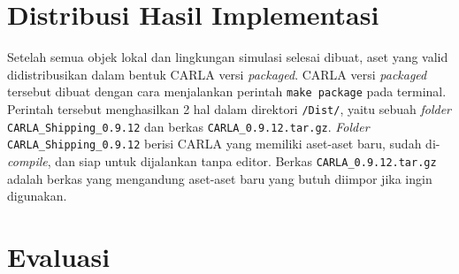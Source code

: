 \section{Distribusi Hasil Implementasi}

Setelah semua objek lokal dan lingkungan simulasi selesai dibuat, aset yang
valid didistribusikan dalam bentuk CARLA versi \textit{packaged}. CARLA versi
\textit{packaged} tersebut dibuat dengan cara menjalankan perintah \verb|make package|
pada terminal. Perintah tersebut menghasilkan 2 hal dalam direktori
\verb|/Dist/|, yaitu sebuah \textit{folder} \verb|CARLA_Shipping_0.9.12| dan
berkas \verb|CARLA_0.9.12.tar.gz|. \textit{Folder} \verb|CARLA_Shipping_0.9.12|
berisi CARLA yang memiliki aset-aset baru, sudah di-\textit{compile}, dan siap
untuk dijalankan tanpa editor. Berkas \verb|CARLA_0.9.12.tar.gz| adalah berkas
yang mengandung aset-aset baru yang butuh diimpor jika ingin digunakan.

\section{Evaluasi}

